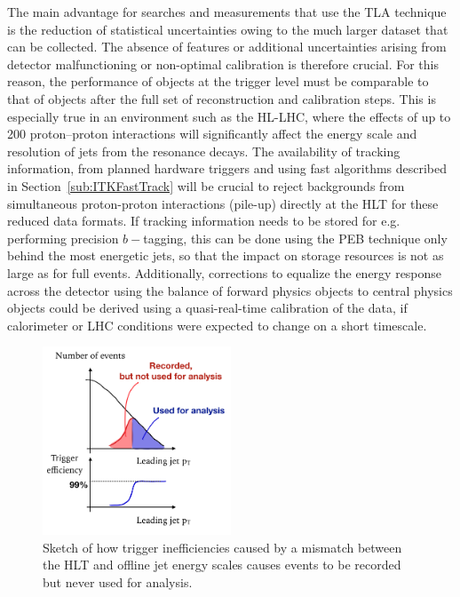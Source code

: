 The main advantage for searches and measurements that use the TLA technique is the reduction of statistical uncertainties owing to the much larger dataset that can be collected. 
The absence of features or additional uncertainties arising from detector malfunctioning or non-optimal calibration is therefore crucial. 
For this reason, the performance of objects at the trigger level must be comparable to that of objects after the full set of reconstruction and calibration steps. 
This is especially true in an environment such as the HL-LHC, where the effects of up to 200 proton--proton interactions will significantly affect the energy scale and resolution of jets from the resonance decays. 
The availability of tracking information, from planned hardware triggers and using fast algorithms described in Section~\ref{sub:ITKFastTrack} will be crucial to reject backgrounds from simultaneous proton-proton interactions (pile-up) directly at the HLT for these reduced data formats.
If tracking information needs to be stored for e.g. performing precision $b-$tagging, this can be done using the PEB technique only behind the most energetic jets, so that the impact on storage resources is not as large as for full events. 
Additionally, corrections to equalize the energy response across the detector using the balance of forward physics objects to central physics objects could be derived using a quasi-real-time calibration of the data, if calorimeter or LHC conditions were expected to change on a short timescale. 

\begin{figure} 
\begin{center}
\includegraphics[width=0.5\textwidth]{figures/efficiencySketch}
\caption{\color{black}\label{fig:wastedRate} \small Sketch of how trigger inefficiencies caused by a mismatch between the HLT and offline jet energy scales causes events to be recorded but never used for analysis.} %
\end{center}
\end{figure}


